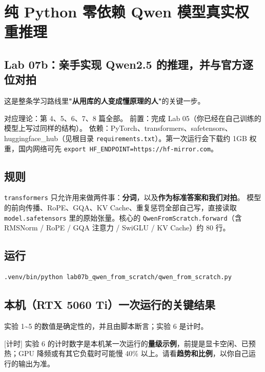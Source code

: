 \chapter{纯 Python 零依赖 Qwen 模型真实权重推理}

\section{Lab 07b：亲手实现 Qwen2.5 的推理，并与官方逐位对拍}

\begin{noteBox}[核心导读与背景]
这是整条学习路线里\textbf{"从用库的人变成懂原理的人"}的关键一步。

对应理论：第 4、5、6、7、8 篇全部。
前置：完成 Lab 05（你已经在自己训练的模型上写过同样的结构）。
依赖：PyTorch、transformers、safetensors、huggingface\_hub（见根目录 \texttt{requirements.txt}）。第一次运行会下载约 1GB 权重，国内网络可先 \texttt{export HF\_ENDPOINT=https://hf-mirror.com}。
\end{noteBox}

\section{规则}

\texttt{transformers} 只允许用来做两件事：\textbf{分词}，以及\textbf{作为标准答案和我们对拍}。
模型的前向传播、RoPE、GQA、KV Cache、重复惩罚全部自己写，直接读取 \texttt{model.safetensors} 里的原始张量。核心的 \texttt{QwenFromScratch.forward}（含 RMSNorm / RoPE / GQA 注意力 / SwiGLU / KV Cache）约 80 行。

\section{运行}

\begin{lstlisting}[language=bash]
.venv/bin/python lab07b_qwen_from_scratch/qwen_from_scratch.py
\end{lstlisting}

\section{本机（RTX 5060 Ti）一次运行的关键结果}

实验 1\textasciitilde{}5 的数值是确定性的，并且由脚本断言；实验 6 是计时。
\begin{noteBox}[核心导读与背景]
{}[计时] 实验 6 的计时数字是本机某一次运行的\textbf{量级示例}，前提是显卡空闲、已预热；GPU 降频或有其它负载时可能慢 40\% 以上。请看\textbf{趋势和比例}，以你自己运行的输出为准。
\end{noteBox}

